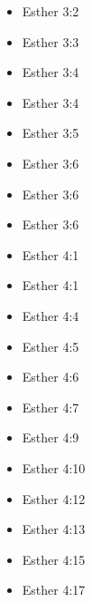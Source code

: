 \documentclass[14pt]{article}
\begin{document}
\begin{multicols}{2}
\begin{itemize}
							\item Esther 3:2
							
							\item Esther 3:3
							
							\item Esther 3:4
							
							\item Esther 3:4
							
							\item Esther 3:5
							
							\item Esther 3:6
							
							\item Esther 3:6
							
							\item Esther 3:6
							
							\item Esther 4:1
							
							\item Esther 4:1
							
							\item Esther 4:4
							
							\item Esther 4:5
							
							\item Esther 4:6
							
							\item Esther 4:7
							
							\item Esther 4:9
							
							\item Esther 4:10
							
							\item Esther 4:12
							
							\item Esther 4:13
							
							\item Esther 4:15
							
							\item Esther 4:17
							

\end{itemize}
\end{multicols}
\end{document}
